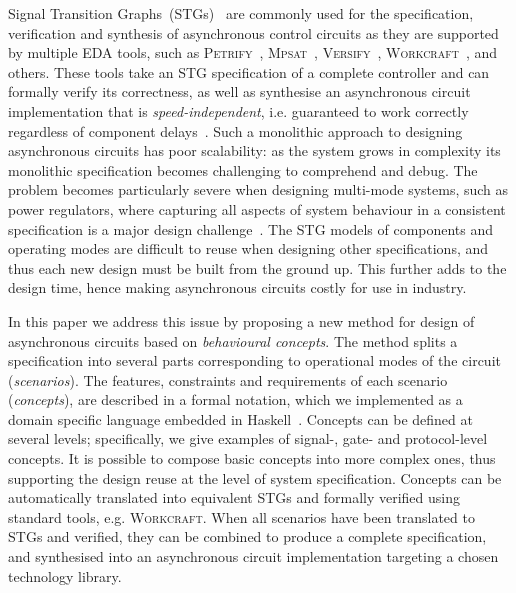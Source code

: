 \documentclass[british, journal]{IEEEtran}
\newcommand{\noun}[1]{\textsc{#1}}
\begin{document}
Signal Transition Graphs~(STGs)~\cite{Chu_1987_phd}\cite{Rosenblum_1985_tpn}
are commonly used for the specification,
verification and synthesis of asynchronous control circuits as they are
supported by multiple EDA tools, such as \noun{Petrify}~\cite{Cortadella},
\noun{Mpsat}~\cite{khomenko2004detecting}, \noun{Versify}~\cite{i1997formal},
\noun{Workcraft}~\cite{2007_poliakov_workcraft}\cite{Workcraft_website}, and others.
These tools take an STG specification of a complete controller and can
formally verify its correctness, as well as synthesise an asynchronous
circuit implementation that is \emph{speed-independent}, i.e. guaranteed
to work correctly regardless of component delays~\cite{Muller_1959_ts}.
Such a monolithic approach to designing asynchronous circuits has
poor scalability: as the system grows in complexity its monolithic
specification becomes challenging to comprehend and debug. The problem
becomes particularly severe when designing multi-mode systems, such as
power regulators, where capturing all aspects of system behaviour in a
consistent specification is a major design challenge~\cite{2014_sokolov_ftfc}\cite{sokolov2015design}.
The STG models of components and operating modes are difficult to reuse
when designing other specifications, and thus each new design must be built
from the ground up. This further adds to the design time, hence making
asynchronous circuits costly for use in industry.

In this paper we address this issue by proposing a new method for design
of asynchronous circuits based on \emph{behavioural concepts}.
The method splits a specification into several parts corresponding
to operational modes of the circuit (\emph{scenarios}). The features,
constraints and requirements of each scenario (\emph{concepts}),
are described in a formal notation, which we implemented as a domain
specific language embedded in Haskell~\cite{1996_hudak_dsl}. Concepts can
be defined at several levels; specifically, we give examples of signal-,
gate- and protocol-level concepts. It is possible to compose basic concepts
into more complex ones, thus supporting the design reuse at the level of system
specification.
Concepts can be automatically translated into equivalent STGs and
formally verified using standard tools, e.g. \noun{Workcraft}.
When all scenarios have been translated to STGs and verified, they can be
combined to produce a complete specification, and synthesised into an
asynchronous circuit implementation targeting a chosen technology library.
\end{document}
